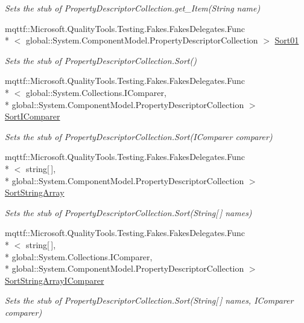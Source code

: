 \begin{DoxyCompactItemize}
\begin{DoxyCompactList}\small\item\em Sets the stub of Property\-Descriptor\-Collection.\-get\-\_\-\-Item(\-String name)\end{DoxyCompactList}\item 
mqttf\-::\-Microsoft.\-Quality\-Tools.\-Testing.\-Fakes.\-Fakes\-Delegates.\-Func\\*
$<$ global\-::\-System.\-Component\-Model.\-Property\-Descriptor\-Collection $>$ \hyperlink{class_system_1_1_component_model_1_1_fakes_1_1_stub_property_descriptor_collection_a6c67e014b639e20e170972f201773cae}{Sort01}
\begin{DoxyCompactList}\small\item\em Sets the stub of Property\-Descriptor\-Collection.\-Sort()\end{DoxyCompactList}\item 
mqttf\-::\-Microsoft.\-Quality\-Tools.\-Testing.\-Fakes.\-Fakes\-Delegates.\-Func\\*
$<$ global\-::\-System.\-Collections.\-I\-Comparer, \\*
global\-::\-System.\-Component\-Model.\-Property\-Descriptor\-Collection $>$ \hyperlink{class_system_1_1_component_model_1_1_fakes_1_1_stub_property_descriptor_collection_a842e0e66770d608d265cc1eefef45831}{Sort\-I\-Comparer}
\begin{DoxyCompactList}\small\item\em Sets the stub of Property\-Descriptor\-Collection.\-Sort(\-I\-Comparer comparer)\end{DoxyCompactList}\item 
mqttf\-::\-Microsoft.\-Quality\-Tools.\-Testing.\-Fakes.\-Fakes\-Delegates.\-Func\\*
$<$ string\mbox{[}$\,$\mbox{]}, \\*
global\-::\-System.\-Component\-Model.\-Property\-Descriptor\-Collection $>$ \hyperlink{class_system_1_1_component_model_1_1_fakes_1_1_stub_property_descriptor_collection_a88d0c3241210e31638fdc458e6eea85c}{Sort\-String\-Array}
\begin{DoxyCompactList}\small\item\em Sets the stub of Property\-Descriptor\-Collection.\-Sort(\-String\mbox{[}$\,$\mbox{]} names)\end{DoxyCompactList}\item 
mqttf\-::\-Microsoft.\-Quality\-Tools.\-Testing.\-Fakes.\-Fakes\-Delegates.\-Func\\*
$<$ string\mbox{[}$\,$\mbox{]}, \\*
global\-::\-System.\-Collections.\-I\-Comparer, \\*
global\-::\-System.\-Component\-Model.\-Property\-Descriptor\-Collection $>$ \hyperlink{class_system_1_1_component_model_1_1_fakes_1_1_stub_property_descriptor_collection_a5379794ffd11bd12bf9ae9311025c1ad}{Sort\-String\-Array\-I\-Comparer}
\begin{DoxyCompactList}\small\item\em Sets the stub of Property\-Descriptor\-Collection.\-Sort(\-String\mbox{[}$\,$\mbox{]} names, I\-Comparer comparer)\end{DoxyCompactList}\end{DoxyCompactItemize}
